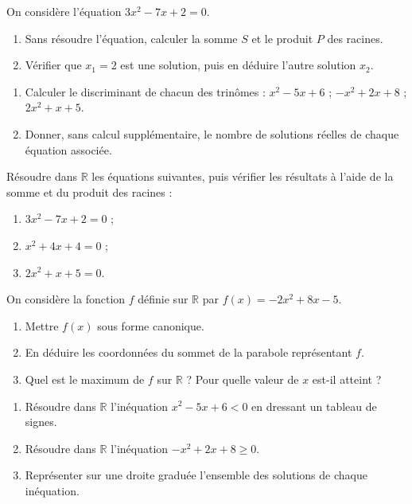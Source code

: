\documentclass[11pt]{article}
\newcounter{popsec}
\newcounter{popsub}
\newcommand{\courssub}[1]{%
  \stepcounter{popsub}%
  \par\vspace{9pt}\noindent{\popxbold\fontsize{11.5}{13}\selectfont\color{popink}{\color{poporange}\thepopsec.\thepopsub}\hspace{6pt}#1}\par\nopagebreak\vspace{4pt}
}
\begin{document}
\begin{exercice}
On considère l'équation $3x^2 - 7x + 2 = 0$.
\begin{enumerate}
\item Sans résoudre l'équation, calculer la somme $S$ et le produit $P$ des racines.
\item Vérifier que $x_1 = 2$ est une solution, puis en déduire l'autre solution $x_2$.
\end{enumerate}
\end{exercice}

\begin{exercice}
\begin{enumerate}
\item Calculer le discriminant de chacun des trinômes : $x^2 - 5x + 6$ ; $-x^2 + 2x + 8$ ; $2x^2 + x + 5$.
\item Donner, sans calcul supplémentaire, le nombre de solutions réelles de chaque équation associée.
\end{enumerate}
\end{exercice}

\courssub{Je m'entraîne}

\begin{exercice}
Résoudre dans $\mathbb{R}$ les équations suivantes, puis vérifier les résultats à l'aide de la somme et du produit des racines :
\begin{enumerate}
\item $3x^2 - 7x + 2 = 0$ ;
\item $x^2 + 4x + 4 = 0$ ;
\item $2x^2 + x + 5 = 0$.
\end{enumerate}
\end{exercice}

\begin{exercice}
On considère la fonction $f$ définie sur $\mathbb{R}$ par $f(x) = -2x^2 + 8x - 5$.
\begin{enumerate}
\item Mettre $f(x)$ sous forme canonique.
\item En déduire les coordonnées du sommet de la parabole représentant $f$.
\item Quel est le maximum de $f$ sur $\mathbb{R}$ ? Pour quelle valeur de $x$ est-il atteint ?
\end{enumerate}
\end{exercice}

\begin{exercice}
\begin{enumerate}
\item Résoudre dans $\mathbb{R}$ l'inéquation $x^2 - 5x + 6 < 0$ en dressant un tableau de signes.
\item Résoudre dans $\mathbb{R}$ l'inéquation $-x^2 + 2x + 8 \geq 0$.
\item Représenter sur une droite graduée l'ensemble des solutions de chaque inéquation.
\end{enumerate}
\end{exercice}
\end{document}
